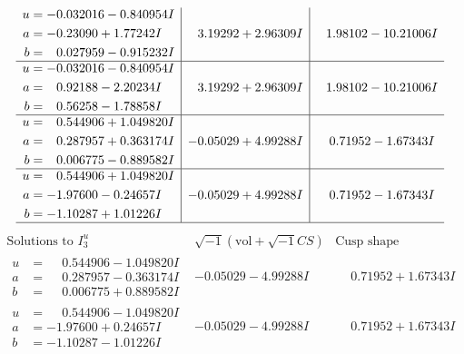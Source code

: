 \documentclass[1p]{elsarticle_modified}
\theoremstyle{definition}
\newcommand{\I}{\sqrt{-1}}
\begin{document}
$$\begin{array}{c|c|c}
\begin{aligned}
u &= -0.032016 - 0.840954 I \\
a &= -0.23090 + 1.77242 I \\
b &= \phantom{-}0.027959 - 0.915232 I\end{aligned}
 & \phantom{-}3.19292 + 2.96309 I & \phantom{-}1.98102 - 10.21006 I \\ \hline\begin{aligned}
u &= -0.032016 - 0.840954 I \\
a &= \phantom{-}0.92188 - 2.20234 I \\
b &= \phantom{-}0.56258 - 1.78858 I\end{aligned}
 & \phantom{-}3.19292 + 2.96309 I & \phantom{-}1.98102 - 10.21006 I \\ \hline\begin{aligned}
u &= \phantom{-}0.544906 + 1.049820 I \\
a &= \phantom{-}0.287957 + 0.363174 I \\
b &= \phantom{-}0.006775 - 0.889582 I\end{aligned}
 & -0.05029 + 4.99288 I & \phantom{-}0.71952 - 1.67343 I \\ \hline\begin{aligned}
u &= \phantom{-}0.544906 + 1.049820 I \\
a &= -1.97600 - 0.24657 I \\
b &= -1.10287 + 1.01226 I\end{aligned}
 & -0.05029 + 4.99288 I & \phantom{-}0.71952 - 1.67343 I\\
 \hline 
 \end{array}$$\newpage$$\begin{array}{c|c|c}  
\text{Solutions to }I^u_{3}& \I (\text{vol} + \sqrt{-1}CS) & \text{Cusp shape}\\
 \hline 
\begin{aligned}
u &= \phantom{-}0.544906 - 1.049820 I \\
a &= \phantom{-}0.287957 - 0.363174 I \\
b &= \phantom{-}0.006775 + 0.889582 I\end{aligned}
 & -0.05029 - 4.99288 I & \phantom{-}0.71952 + 1.67343 I \\ \hline\begin{aligned}
u &= \phantom{-}0.544906 - 1.049820 I \\
a &= -1.97600 + 0.24657 I \\
b &= -1.10287 - 1.01226 I\end{aligned}
 & -0.05029 - 4.99288 I & \phantom{-}0.71952 + 1.67343 I \\ \hline\begin{aligned}

\end{aligned}
\end{array}$$
\end{document}
